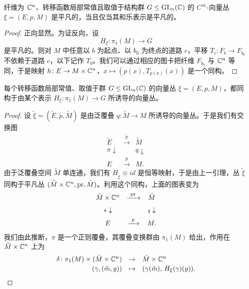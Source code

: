 \begin{proposition}[3.27]
纤维为 $\mathbb{C}^n$、转移函数局部常值且取值于结构群 $G\le\operatorname{GL}_n(\mathbb{C})$ 的 $C^\infty$-向量丛 $\xi=(E,p,M)$ 是平凡的，当且仅当其和乐表示是平凡的。
\end{proposition}

\begin{proof}
正向显然。为证反向，设
\[
H_\xi\colon \pi_1(M)\to G
\]
是平凡的。则对 $M$ 中任意以 $b$ 为起点、以 $b_0$ 为终点的道路 $c$，平移 $T_c\colon F_b\to F_{b_0}$ 不依赖于道路 $c$，以下记作 $T_b$。我们可以通过相应的图卡把纤维 $F_{b_0}$ 与 $\mathbb{C}^n$ 等同，于是映射 $h\colon E\to M\times\mathbb{C}^n$，$x\mapsto(p(x),T_{p(x)}(x))$ 是一个同构。
\end{proof}

\begin{theorem}[3.28]
每个转移函数局部常值、取值于群 $G\le\operatorname{GL}_n(\mathbb{C})$ 的向量丛 $\xi=(E,p,M)$，都同构于由某个表示 $H_\xi\colon\pi_1(M)\to G$ 所诱导的向量丛。
\end{theorem}

\begin{proof}
设 $\tilde\xi=(\tilde E,\tilde p,\tilde M)$ 是由泛覆叠 $q\colon\tilde M\to M$ 所诱导的向量丛。于是我们有交换图
\[
\begin{array}{ccc}
\tilde E & \xrightarrow{\ \tilde p\ } & \tilde M\\[6pt]
{\scriptstyle \pi}\downarrow & & {\scriptstyle q}\downarrow\\[6pt]
E & \xrightarrow{\ p\ } & M .
\end{array}
\]
由于泛覆叠空间 $\tilde M$ 单连通，我们有 $H_{\tilde\xi}\equiv id$ 是恒等映射，于是由上一引理，丛 $\tilde\xi$ 同构于平凡丛 $(\tilde M\times\mathbb{C}^n,\mathrm{pr},\tilde M)$。利用这个同构，上面的图表变为
\[
\begin{array}{ccc}
\tilde M\times\mathbb{C}^n & \xrightarrow{\ \mathrm{pr}\ } & \tilde M\\[6pt]
{\scriptstyle \pi}\downarrow & & {\scriptstyle q}\downarrow\\[6pt]
E & \xrightarrow{\ p\ } & M .
\end{array}
\]
我们由此推断，$\pi$ 是一个正则覆叠，其覆叠变换群由 $\pi_1(M)$ 给出，作用在 $\tilde M\times\mathbb{C}^n$ 上为
\[
\begin{array}{rcl}
\delta\colon \pi_1(M)\times(\tilde M\times\mathbb{C}^n) & \to & \tilde M\times\mathbb{C}^n\\[2pt]
(\gamma,(\tilde m,y)) & \mapsto & (\gamma(\tilde m),\,H_\xi(\gamma)(y)) .
\end{array}
\]
\end{proof}

